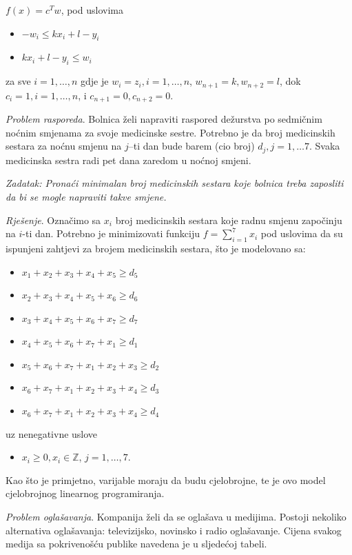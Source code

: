 \documentclass[a4paper, utf8, 11pt, colorlinks]{book}
\begin{document}
$f(x) = c^T w$, pod uslovima
\begin{itemize}
    \item $ -w_i \leq k x_i + l - y_i$ 
    \item $ k x_i + l - y_i \leq w_i $
\end{itemize}
za sve $i = 1, \ldots, n$ gdje je 
$w_i = z_i, i=1,\ldots,n$, $w_{n+1} = k, w_{n+2} = l$, dok 
$c_i = 1, i=1,\ldots,n$, i $c_{n+1} = 0, c_{n+2} = 0$. 

\emph{Problem rasporeda}. Bolnica želi napraviti raspored dežurstva po sedmičnim noćnim smjenama za svoje medicinske sestre. Potrebno je da broj medicinskih sestara za noćnu smjenu na $j$--ti dan bude barem (cio broj) $d_j, j = 1,\ldots 7$. Svaka
medicinska sestra radi pet dana zaredom u noćnoj smjeni. 

\emph{Zadatak: Pronaći minimalan broj medicinskih sestara koje bolnica treba zaposliti da bi se mogle napraviti takve smjene.}

\emph{Rješenje}. Označimo sa $x_i$ broj medicinskih sestara koje radnu smjenu započinju na $i$-ti dan. Potrebno je minimizovati funkciju 
$f = \sum_{i=1}^7 x_i$ pod uslovima da su ispunjeni zahtjevi za brojem medicinskih sestara, što je modelovano sa:
\begin{itemize}
    \item $x_1 + x_2 + x_3 + x_4 + x_5 \geq d_5 $
    \item $x_2 + x_3 + x_4 + x_5 + x_6 \geq d_6$
    \item $x_3 + x_4 + x_5 + x_6 + x_7 \geq d_7$
    \item $x_4 + x_5 + x_6 + x_7 + x_1 \geq d_1 $
    \item $x_5 + x_6 + x_7 + x_1 + x_2 + x_3 \geq d_2$
    \item $x_6 + x_7 + x_1 + x_2 + x_3 + x_4 \geq d_3$
    \item $x_6 + x_7 + x_1 + x_2 + x_3 + x_4 \geq d_4$
\end{itemize}
uz nenegativne uslove 
\begin{itemize}
    \item $x_i \geq 0, x_i \in \mathbb{Z}$, $j=1,\ldots,7.$
\end{itemize}
Kao što je primjetno, varijable moraju da budu cjelobrojne, te je ovo model cjelobrojnog linearnog programiranja.

\emph{Problem oglašavanja}. Kompanija želi da se oglašava u medijima. Postoji nekoliko alternativa oglašavanja:  televizijsko, novinsko i radio oglašavanje. Cijena svakog medija sa pokrivenošću publike navedena je u sljedećoj tabeli.
\end{document}
